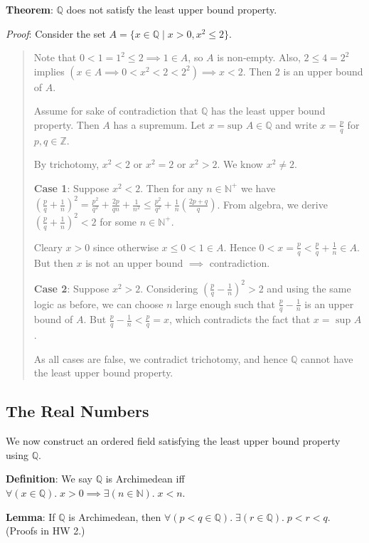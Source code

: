 \documentclass[11pt]{article}
\begin{document}
\textbf{Theorem}: $\mathbb{Q}$ does not satisfy the least upper bound property.

\emph{Proof}: Consider the set $A = \{x \in \mathbb{Q} \;|\; x > 0, x^2 \leq 2\}$.
\begin{quote}\vspace{-0.3cm}
Note that $0 < 1 = 1^2 \leq 2 \implies 1 \in A$, so $A$ is non-empty. Also, $2 \leq 4 = 2^2$ implies $(x \in A \implies 0 < x^2 < 2 < 2^2) \implies x < 2$. Then 2 is an upper bound of $A$.

Assume for sake of contradiction that $\mathbb{Q}$ has the least upper bound property. Then $A$ has a supremum. Let $x = \text{sup }A \in \mathbb{Q}$ and write $x = \frac{p}{q}$ for $p,q \in \mathbb{Z}$.

By trichotomy, $x^2 < 2$ or $x^2 = 2$ or $x^2 > 2$. We know $x^2 \neq 2$.

\textbf{Case 1}: Suppose $x^2 < 2$. Then for any $n \in \mathbb{N}^+$ we have $(\frac{p}{q} + \frac{1}{n})^2 = \frac{p^2}{q^2} + \frac{2p}{qn} + \frac{1}{n^2} \leq \frac{p^2}{q^2} + \frac{1}{n}(\frac{2p+q}{q})$. From algebra, we derive $(\frac{p}{q} + \frac{1}{n})^2 < 2$ for some $n \in \mathbb{N}^+$.

Cleary $x > 0$ since otherwise $x \leq 0 < 1 \in A$. Hence $0 < x = \frac{p}{q} < \frac{p}{q} + \frac{1}{n} \in A$. But then $x$ is not an upper bound $\implies$ contradiction.

\textbf{Case 2}: Suppose $x^2 > 2$. Considering $(\frac{p}{q} - \frac{1}{n})^2 > 2$ and using the same logic as before, we can choose $n$ large enough such that $\frac{p}{q} - \frac{1}{n}$ is an upper bound of $A$. But $\frac{p}{q} - \frac{1}{n} < \frac{p}{q} = x$, which contradicts the fact that $x = \text{ sup }A$.

As all cases are false, we contradict trichotomy, and hence $\mathbb{Q}$ cannot have the least upper bound property.
\end{quote}

\subsection{The Real Numbers}

We now construct an ordered field satisfying the least upper bound property using $\mathbb{Q}$.

\textbf{Definition}: We say $\mathbb{Q}$ is Archimedean iff $\forall (x \in \mathbb{Q}).\; x > 0 \implies \exists (n \in \mathbb{N}).\; x < n$.

\textbf{Lemma}: If $\mathbb{Q}$ is Archimedean, then $\forall (p < q \in \mathbb{Q}).\; \exists (r \in \mathbb{Q}).\; p < r < q$.\\
(Proofs in HW 2.)
\end{document}
